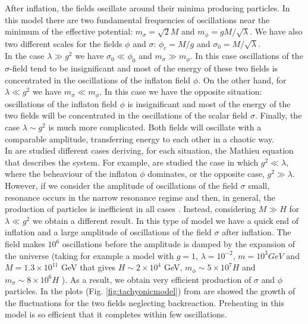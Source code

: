 \documentclass[11pt,a4paper,twoside]{book}
\begin{document}
After inflation, the fields oscillate around their minima producing particles. In this model there are two fundamental frequencies of oscillations near the minimum of the effective potential: $ m_{\sigma}=\sqrt{2}M $ and $ m_{\phi}=gM/\sqrt{\lambda} $. We have also two different scales for the fields $\phi$ and $\sigma$: $ \phi_{c}=M/g $ and $\sigma_{0}=M/\sqrt{\lambda}$.\\
In the case $\lambda \gg g^{2}$ we have $ \sigma_{0}\ll\phi_{0} $ and $ m_{\sigma} \gg m_{\phi} $. In this case oscillations of the $\sigma$-field tend to be insignificant and most of the energy of these two fields is concentrated in the oscillations of the inflaton field $\phi$. On the other hand, for $\lambda \ll g^{2}$ we have $ m_{\sigma} \ll m_{\phi} $. In this case we have the opposite situation: oscillations of the inflaton field $\phi$ is insignificant and most of the energy of the two fields will be concentrated in the oscillations of the scalar field $\sigma$. Finally,  the case $ \lambda \sim g^{2} $ is much more complicated. Both fields will oscillate with a comparable amplitude, transferring energy to each other in a chaotic way.\\
In \cite{Chap4:TachyonicPreheating} are studied different cases deriving, for each situation, the Mathieu equation that describes the system. For example, are studied the case in which  $g^{2} \ll \lambda$, where the beheaviour of the inflaton $\phi$ dominates, or the opposite case,  $g^{2} \gg \lambda$. However, if we consider the amplitude of oscillations of the field $\sigma$ small, resonance occurs in the narrow resonance regime and then, in general, the production of particles is inefficient in all cases . Instead, considering $ M \gg H $ for $ \lambda \ll g^{2} $ we obtain a different result. In this type of model we have a quick end of inflation and a large amplitude of oscillations of the field $\sigma$ after inflation. The field makes $ 10^{6} $ oscillations before the amplitude is damped by the expansion of the universe (taking for example a model with $ g=1$, $\lambda=10^{-2}$, $ m=10^{3} GeV $ and $ M=1.3 \times 10^{11} $ GeV that gives $ H \sim 2\times 10^{4}$ GeV, $ m_{\phi} \sim 5 \times 10^{7} H $ and $ m_{\sigma} \sim 8 \times 10^{6} H $ ). 
As a result, we obtain very efficient production of $\sigma$ and $\phi$ particles. In the plots (Fig. \ref{fig:tachyonicmodel}) from \cite{Chap4:TachyonicPreheating} are showed the growth of the fluctuations for the two fields neglecting backreaction. Preheating in this model is so efficient that it completes within few oscillations.\\
\end{document}
